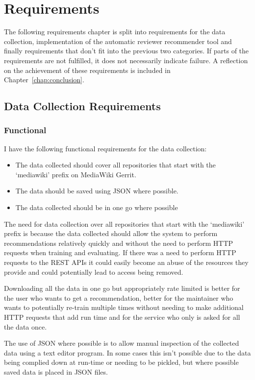 \chapter{Requirements\label{chap:requirements}}

The following requirements chapter is split into requirements for the data collection, implementation of the automatic reviewer recommender tool and finally requirements that don't fit into the previous two categories. If parts of the requirements are not fulfilled, it does not necessarily indicate failure. A reflection on the achievement of these requirements is included in Chapter~\ref{chap:conclusion}.

\section{Data Collection Requirements}
\subsection{Functional}
I have the following functional requirements for the data collection:
\begin{itemize}
    \item The data collected should cover all repositories that start with the `mediawiki' prefix on MediaWiki Gerrit.
    \item The data should be saved using JSON where possible.
    \item The data collected should be in one go where possible
\end{itemize}

The need for data collection over all repositories that start with the  `mediawiki' prefix is because the data collected should allow the system to perform recommendations relatively quickly and without the need to perform HTTP requests when training and evaluating. If there was a need to perform HTTP requests to the REST APIs it could easily become an abuse of the resources they provide and could potentially lead to access being removed.

Downloading all the data in one go but appropriately rate limited is better for the user who wants to get a recommendation, better for the maintainer who wants to potentially re-train multiple times without needing to make additional HTTP requests that add run time and for the service who only is asked for all the data once.

The use of JSON where possible is to allow manual inspection of the collected data using a text editor program. In some cases this isn't possible due to the data being complied down at run-time or needing to be pickled, but where possible saved data is placed in JSON files.

